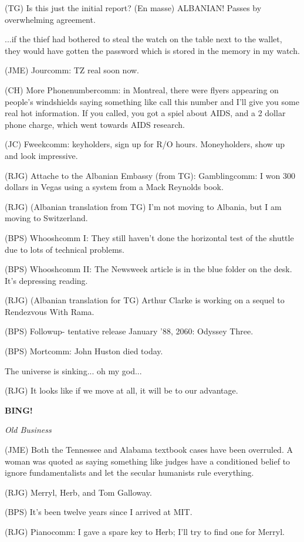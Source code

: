 \documentclass[12pt]{article}
\newcommand{\bing}{{\bf BING!} }
\newcommand{\goto}[1]{\bing \vskip 12pt \centerline{{\em{#1}}}}
\begin{document}
(TG) Is this just the initial report? (En masse) ALBANIAN! Passes by overwhelming agreement.

...if the thief had bothered to steal the watch on the table next to the wallet, they would have gotten the password which is stored in the memory in my watch.

(JME) Jourcomm: TZ real soon now.

(CH) More Phonenumbercomm: in Montreal, there were flyers appearing on people's windshields saying something like call this number and I'll give you some real hot information. If you called, you got a spiel about AIDS, and a 2 dollar phone charge, which went towards AIDS research.

(JC) Fweekcomm: keyholders, sign up for R/O hours. Moneyholders, show up and look impressive.

(RJG) Attache to the Albanian Embassy (from TG): Gamblingcomm: I won 300 dollars in Vegas using a system from a Mack Reynolds book.

(RJG) (Albanian translation from TG) I'm not moving to Albania, but I am moving to Switzerland.

(BPS) Whooshcomm I: They still haven't done the horizontal test of the shuttle due to lots of technical problems.

(BPS) Whooshcomm II: The Newsweek article is in the blue folder on the desk. It's depressing reading.

(RJG) (Albanian translation for TG) Arthur Clarke is working on a sequel to Rendezvous With Rama.

(BPS) Followup- tentative release January '88, 2060: Odyssey Three.

(BPS) Mortcomm: John Huston died today.

The universe is sinking... oh my god...

(RJG) It looks like if we move at all, it will be to our advantage.

\goto{Old Business}

(JME) Both the Tennessee and Alabama textbook cases have been overruled. A woman was quoted as saying something like judges have a conditioned belief to ignore fundamentalists and let the secular humanists rule everything.

(RJG) Merryl, Herb, and Tom Galloway.

(BPS) It's been twelve years since I arrived at MIT.

(RJG) Pianocomm: I gave a spare key to Herb; I'll try to find one for Merryl.
\end{document}
